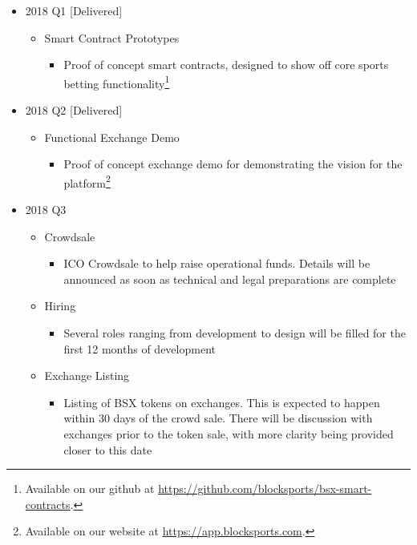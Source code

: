 \documentclass{article}
\begin{document}
\begin{itemize}

   \item 2018 Q1 [Delivered]
   \begin{itemize}
     \item Smart Contract Prototypes
     	\begin{itemize}
     		\item Proof of concept smart contracts, designed to show off core sports betting functionality\footnote{Available on our github at \url{https://github.com/blocksports/bsx-smart-contracts}.}
     	\end{itemize}
   \end{itemize}

   \item 2018 Q2 [Delivered]
   \begin{itemize}
     \item Functional Exchange Demo
     	\begin{itemize}
     		\item Proof of concept exchange demo for demonstrating the vision for the platform\footnote{Available on our website at \url{https://app.blocksports.com}.}
     	\end{itemize}
   \end{itemize}

   \item 2018 Q3
   \begin{itemize}
     \item Crowdsale
     	\begin{itemize}
     		\item ICO Crowdsale to help raise operational funds. Details will be announced as soon as technical and legal preparations are complete
     	\end{itemize}
     \item Hiring
     	\begin{itemize}
     		\item Several roles ranging from development to design will be filled for the first 12 months of development
     	\end{itemize}
      \item Exchange Listing
     	\begin{itemize}
     		\item Listing of BSX tokens on exchanges. This is expected to happen within 30 days of the crowd sale. There will be discussion with exchanges prior to the token sale, with more clarity being provided closer to this date
     	\end{itemize}
   \end{itemize}


\end{itemize}
\end{document}
